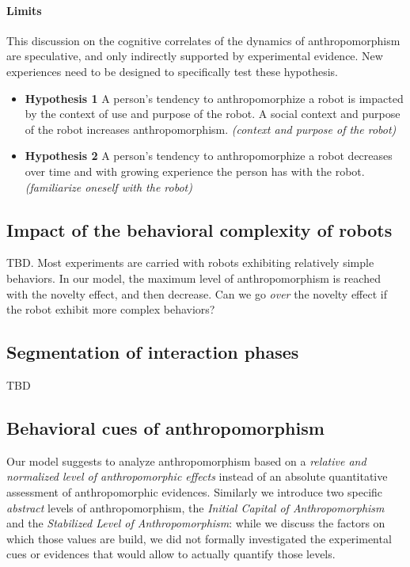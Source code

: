 \documentclass{frontiersSCNS} %
\begin{document}
\paragraph{Limits} This discussion on the cognitive correlates of the dynamics
of anthropomorphism are speculative, and only indirectly supported by
experimental evidence. New experiences need to be designed to specifically test
these hypothesis.


\begin{itemize}
    \item \textbf{Hypothesis 1} A person's tendency to anthropomorphize a robot
        is impacted by the context of use and purpose of the robot. A social
        context and purpose of the robot increases anthropomorphism.
        \textit{(context and purpose of the robot)}
	\item \textbf{Hypothesis 2} A person's tendency to anthropomorphize a robot decreases over time and with growing experience the person has with the robot. \textit{(familiarize oneself with the robot)}
\end{itemize}

\subsection{Impact of the behavioral complexity of robots}

TBD. Most experiments are carried with robots exhibiting relatively simple
behaviors. In our model, the maximum level of anthropomorphism is reached with
the novelty effect, and then decrease. Can we go \emph{over} the novelty effect
if the robot exhibit more complex behaviors?

\subsection{Segmentation of interaction phases}

TBD

\subsection{Behavioral cues of anthropomorphism}
\label{sec:behavioralcues}

Our model suggests to analyze anthropomorphism based on a \emph{relative and
normalized level of anthropomorphic effects} instead of an absolute
quantitative assessment of anthropomorphic evidences. Similarly we introduce
two specific \emph{abstract} levels of anthropomorphism, the \emph{Initial
Capital of Anthropomorphism} and the \emph{Stabilized Level of
Anthropomorphism}: while we discuss the factors on which those values are
build, we did not formally investigated the experimental cues or evidences
that would allow to actually quantify those levels.
\end{document}
